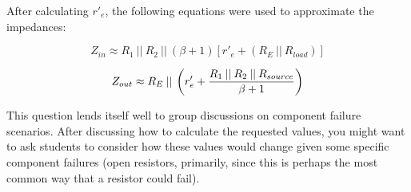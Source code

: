 After calculating $r'_e$, the following equations were used to approximate the impedances:

$$Z_{in} \approx R_1 \> || \> R_2 \> || \> (\beta + 1)[r'_e + (R_E \> || \> R_{load})]$$

$$Z_{out} \approx R_E \> || \> \left( r'_e + {{R_1 \> || \> R_2 \> || \> R_{source}} \over {\beta + 1}} \right) $$

This question lends itself well to group discussions on component failure scenarios.  After discussing how to calculate the requested values, you might want to ask students to consider how these values would change given some specific component failures (open resistors, primarily, since this is perhaps the most common way that a resistor could fail).




